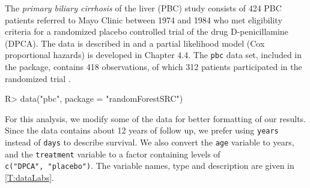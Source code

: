 \documentclass[article, nojss]{jss}
\begin{document}
The \emph{primary biliary cirrhosis} of the liver (PBC) study consists
of 424 PBC patients referred to Mayo Clinic between 1974 and 1984 who
met eligibility criteria for a randomized placebo controlled trial of
the drug D-penicillamine (DPCA). The data is described in
\cite[Chapter 0.2]{fleming:1991} and a partial likelihood model (Cox
proportional hazards) is developed in Chapter 4.4. The \texttt{pbc} data
set, included in the  package, contains 418
observations, of which 312 patients participated in the randomized trial
\cite[Appendix D]{fleming:1991}.

\begin{Schunk}
\begin{Sinput}
R> data("pbc", package = "randomForestSRC")
\end{Sinput}
\end{Schunk}

For this analysis, we modify some of the data for better formatting of
our results. Since the data contains about 12 years of follow up, we
prefer using \texttt{years} instead of \texttt{days} to describe
survival. We also convert the \texttt{age} variable to years, and the
\texttt{treatment} variable to a factor containing levels of
\texttt{c("DPCA",\ "placebo")}. The variable names, type and description
are given in \autoref{T:dataLabs}.
\end{document}
